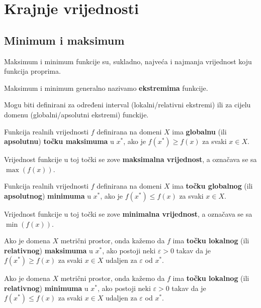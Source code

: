 \section{Krajnje vrijednosti}

\subsection{Minimum i maksimum}

Maksimum i minimum funkcije su, sukladno, najveća i najmanja vrijednost koju
funkcija proprima.

Maksimum i minimum generalno nazivamo \textbf{ekstremima} funkcije.

Mogu biti definirani za određeni interval (lokalni/relativni ekstremi) ili za
cijelu domenu (globalni/apsolutni ekstremi) funckije.

\begin{multicols}{2}
    
\begin{definition}
    Funkcija realnih vrijednosti $f$ definirana na domeni $X$ ima
    \textbf{globalnu} (ili \textbf{apsolutnu}) \textbf{točku maksimuma} u $x^*$,
    ako je $f(x^*) \geq f(x)$ za svaki $x \in X$.

    \smallskip
    Vrijednost funkcije u toj točki se zove \textbf{maksimalna vrijednost}, a
    označava se sa $\max(f(x))$.
\end{definition}

\begin{definition}
    Funkcija realnih vrijednosti $f$ definirana na domeni $X$ ima
    \textbf{točku globalnog} (ili \textbf{apsolutnog}) \textbf{minimuma} u $x^*$,
    ako je $f(x^*) \leq f(x)$ za svaki $x \in X$.

    \smallskip
    Vrijednost funkcije u toj točki se zove \textbf{minimalna vrijednost}, a
    označava se sa $\min(f(x))$.
\end{definition}

\begin{definition}
    Ako je domena $X$ metrični prostor, onda kažemo da $f$ ima \textbf{točku
    lokalnog} (ili \textbf{relativnog}) \textbf{maksimuma} u $x^*$, ako postoji
    neki $\varepsilon > 0$ takav da je $f(x^*) \geq f(x)$ za svaki $x \in X$
    udaljen za $\varepsilon$ od $x^*$.
\end{definition}

\begin{definition}
    Ako je domena $X$ metrični prostor, onda kažemo da $f$ ima \textbf{točku
    lokalnog} (ili \textbf{relativnog}) \textbf{minimuma} u $x^*$, ako postoji
    neki $\varepsilon > 0$ takav da je $f(x^*) \leq f(x)$ za svaki $x \in X$
    udaljen za $\varepsilon$ od $x^*$.
\end{definition}

\end{multicols}

